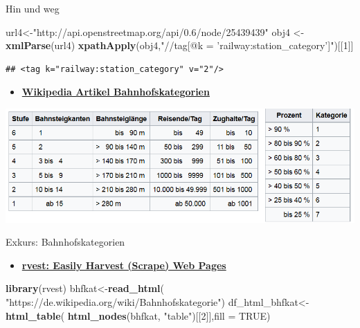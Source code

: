 \documentclass[ignorenonframetext,]{beamer}
\newenvironment{Shaded}{\begin{snugshade}}{\end{snugshade}}
\newcommand{\KeywordTok}[1]{\textcolor[rgb]{0.13,0.29,0.53}{\textbf{#1}}}
\newcommand{\DataTypeTok}[1]{\textcolor[rgb]{0.13,0.29,0.53}{#1}}
\newcommand{\DecValTok}[1]{\textcolor[rgb]{0.00,0.00,0.81}{#1}}
\newcommand{\StringTok}[1]{\textcolor[rgb]{0.31,0.60,0.02}{#1}}
\newcommand{\OtherTok}[1]{\textcolor[rgb]{0.56,0.35,0.01}{#1}}
\newcommand{\NormalTok}[1]{#1}
\providecommand{\tightlist}{%
  \setlength{\itemsep}{0pt}\setlength{\parskip}{0pt}}
\begin{document}
\begin{frame}[fragile]{Hin und weg}

\begin{Shaded}
\begin{Highlighting}[]
\NormalTok{url4<-}\StringTok{"http://api.openstreetmap.org/api/0.6/node/25439439"}
\NormalTok{obj4 <-}\StringTok{ }\KeywordTok{xmlParse}\NormalTok{(url4)}
\KeywordTok{xpathApply}\NormalTok{(obj4,}\StringTok{"//tag[@k = 'railway:station_category']"}\NormalTok{)[[}\DecValTok{1}\NormalTok{]]}
\end{Highlighting}
\end{Shaded}

\begin{verbatim}
## <tag k="railway:station_category" v="2"/>
\end{verbatim}

\begin{itemize}
\tightlist
\item
  \href{https://de.wikipedia.org/wiki/Bahnhofskategorie}{\textbf{Wikipedia
  Artikel Bahnhofskategorien}}
\end{itemize}

\includegraphics{figure/Bahnhofskategorien.PNG}

\end{frame}

\begin{frame}[fragile]{Exkurs: Bahnhofskategorien}

\begin{itemize}
\tightlist
\item
  \href{https://cran.r-project.org/web/packages/rvest/index.html}{\textbf{rvest:
  Easily Harvest (Scrape) Web Pages}}
\end{itemize}

\begin{Shaded}
\begin{Highlighting}[]
\KeywordTok{library}\NormalTok{(rvest)}
\NormalTok{bhfkat<-}\KeywordTok{read_html}\NormalTok{(}
  \StringTok{"https://de.wikipedia.org/wiki/Bahnhofskategorie"}\NormalTok{)}
\NormalTok{df_html_bhfkat<-}\KeywordTok{html_table}\NormalTok{(}
  \KeywordTok{html_nodes}\NormalTok{(bhfkat, }\StringTok{"table"}\NormalTok{)[[}\DecValTok{2}\NormalTok{]],}\DataTypeTok{fill =} \OtherTok{TRUE}\NormalTok{)}
\end{Highlighting}
\end{Shaded}

\end{frame}
\end{document}
